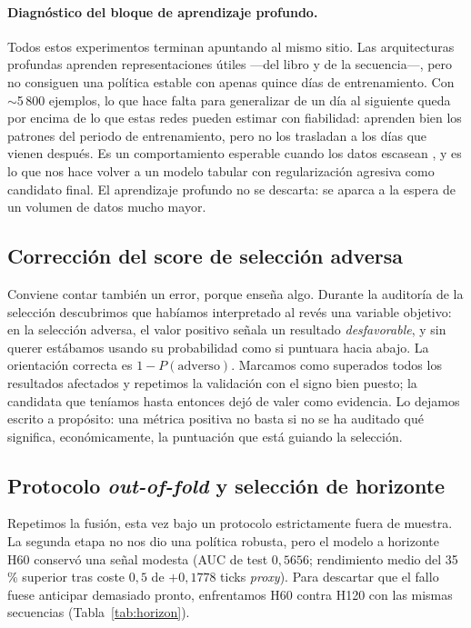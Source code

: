\documentclass[11pt,a4paper]{article}
\begin{document}
\paragraph{Diagnóstico del bloque de aprendizaje profundo.}
Todos estos experimentos terminan apuntando al mismo sitio. Las arquitecturas
profundas aprenden representaciones útiles ---del libro y de la secuencia---, pero
no consiguen una política estable con apenas quince días de entrenamiento. Con
$\sim$5\,800 ejemplos, lo que hace falta para generalizar de un día al siguiente
queda por encima de lo que estas redes pueden estimar con fiabilidad: aprenden bien
los patrones del periodo de entrenamiento, pero no los trasladan a los días que
vienen después. Es un comportamiento esperable cuando los datos escasean
\cite{gu2020empirical}, y es lo que nos hace volver a un modelo tabular con
regularización agresiva como candidato final. El aprendizaje profundo no se
descarta: se aparca a la espera de un volumen de datos mucho mayor.

\subsection{Corrección del score de selección adversa}

Conviene contar también un error, porque enseña algo. Durante la auditoría de la
selección descubrimos que habíamos interpretado al revés una variable objetivo: en
la selección adversa, el valor positivo señala un resultado \emph{desfavorable}, y
sin querer estábamos usando su probabilidad como si puntuara hacia abajo. La
orientación correcta es $1 - P(\text{adverso})$. Marcamos como superados todos los
resultados afectados y repetimos la validación con el signo bien puesto; la
candidata que teníamos hasta entonces dejó de valer como evidencia. Lo dejamos
escrito a propósito: una métrica positiva no basta si no se ha auditado qué
significa, económicamente, la puntuación que está guiando la selección.

\subsection{Protocolo \emph{out-of-fold} y selección de horizonte}

Repetimos la fusión, esta vez bajo un protocolo estrictamente fuera de muestra. La
segunda etapa no nos dio una política robusta, pero el modelo a horizonte H60
conservó una señal modesta (AUC de test $0{,}5656$; rendimiento medio del 35\,\%
superior tras coste $0{,}5$ de $+0{,}1778$ ticks \emph{proxy}). Para descartar que
el fallo fuese anticipar demasiado pronto, enfrentamos H60 contra H120 con las
mismas secuencias (Tabla~\ref{tab:horizon}).
\end{document}
